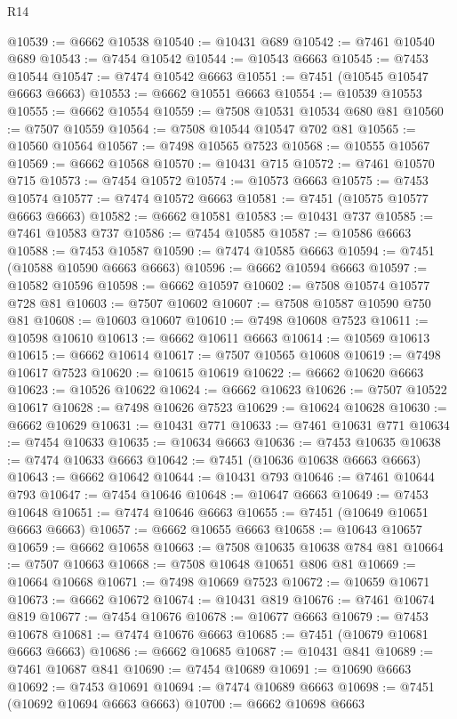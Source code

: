 \begin{lexlean}{R14}
\begin{coremodule}
{{{{{{{{{{{{{{{{{{{{{{{{{{{{{{{{{{{{{{{{{{{{{{{{{{{{{{{{{{{{{{{{{{{{{{{{{{{{{{{{{{@10539 := @6662 @10538
@10540 := @10431 @689
@10542 := @7461 @10540 @689
@10543 := @7454 @10542
@10544 := @10543 @6663
@10545 := @7453 @10544
@10547 := @7474 @10542 @6663
@10551 := @7451 (@10545 @10547 @6663 @6663)
@10553 := @6662 @10551 @6663
@10554 := @10539 @10553
@10555 := @6662 @10554
@10559 := @7508 @10531 @10534 @680 @81
@10560 := @7507 @10559
@10564 := @7508 @10544 @10547 @702 @81
@10565 := @10560 @10564
@10567 := @7498 @10565 @7523
@10568 := @10555 @10567
@10569 := @6662 @10568
@10570 := @10431 @715
@10572 := @7461 @10570 @715
@10573 := @7454 @10572
@10574 := @10573 @6663
@10575 := @7453 @10574
@10577 := @7474 @10572 @6663
@10581 := @7451 (@10575 @10577 @6663 @6663)
@10582 := @6662 @10581
@10583 := @10431 @737
@10585 := @7461 @10583 @737
@10586 := @7454 @10585
@10587 := @10586 @6663
@10588 := @7453 @10587
@10590 := @7474 @10585 @6663
@10594 := @7451 (@10588 @10590 @6663 @6663)
@10596 := @6662 @10594 @6663
@10597 := @10582 @10596
@10598 := @6662 @10597
@10602 := @7508 @10574 @10577 @728 @81
@10603 := @7507 @10602
@10607 := @7508 @10587 @10590 @750 @81
@10608 := @10603 @10607
@10610 := @7498 @10608 @7523
@10611 := @10598 @10610
@10613 := @6662 @10611 @6663
@10614 := @10569 @10613
@10615 := @6662 @10614
@10617 := @7507 @10565 @10608
@10619 := @7498 @10617 @7523
@10620 := @10615 @10619
@10622 := @6662 @10620 @6663
@10623 := @10526 @10622
@10624 := @6662 @10623
@10626 := @7507 @10522 @10617
@10628 := @7498 @10626 @7523
@10629 := @10624 @10628
@10630 := @6662 @10629
@10631 := @10431 @771
@10633 := @7461 @10631 @771
@10634 := @7454 @10633
@10635 := @10634 @6663
@10636 := @7453 @10635
@10638 := @7474 @10633 @6663
@10642 := @7451 (@10636 @10638 @6663 @6663)
@10643 := @6662 @10642
@10644 := @10431 @793
@10646 := @7461 @10644 @793
@10647 := @7454 @10646
@10648 := @10647 @6663
@10649 := @7453 @10648
@10651 := @7474 @10646 @6663
@10655 := @7451 (@10649 @10651 @6663 @6663)
@10657 := @6662 @10655 @6663
@10658 := @10643 @10657
@10659 := @6662 @10658
@10663 := @7508 @10635 @10638 @784 @81
@10664 := @7507 @10663
@10668 := @7508 @10648 @10651 @806 @81
@10669 := @10664 @10668
@10671 := @7498 @10669 @7523
@10672 := @10659 @10671
@10673 := @6662 @10672
@10674 := @10431 @819
@10676 := @7461 @10674 @819
@10677 := @7454 @10676
@10678 := @10677 @6663
@10679 := @7453 @10678
@10681 := @7474 @10676 @6663
@10685 := @7451 (@10679 @10681 @6663 @6663)
@10686 := @6662 @10685
@10687 := @10431 @841
@10689 := @7461 @10687 @841
@10690 := @7454 @10689
@10691 := @10690 @6663
@10692 := @7453 @10691
@10694 := @7474 @10689 @6663
@10698 := @7451 (@10692 @10694 @6663 @6663)
@10700 := @6662 @10698 @6663
}}}}}}}}}}}}}}}}}}}}}}}}}}}}}}}}}}}}}}}}}}}}}}}}}}}}}}}}}}}}}}}}}}}}}}}}}}}}}}}}}}
\end{coremodule}
\end{lexlean}
